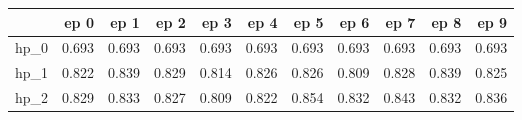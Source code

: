 \begin{tabular}{lrrrrrrrrrr}
\toprule
{} &   ep 0 &   ep 1 &   ep 2 &   ep 3 &   ep 4 &   ep 5 &   ep 6 &   ep 7 &   ep 8 &   ep 9 \\
\midrule
hp\_0 &  0.693 &  0.693 &  0.693 &  0.693 &  0.693 &  0.693 &  0.693 &  0.693 &  0.693 &  0.693 \\
hp\_1 &  0.822 &  0.839 &  0.829 &  0.814 &  0.826 &  0.826 &  0.809 &  0.828 &  0.839 &  0.825 \\
hp\_2 &  0.829 &  0.833 &  0.827 &  0.809 &  0.822 &  0.854 &  0.832 &  0.843 &  0.832 &  0.836 \\
\bottomrule
\end{tabular}
